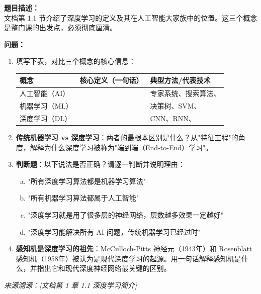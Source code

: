 \documentclass[a4paper,11pt]{ctexart}
\begin{document}
\begin{problembox}
    \textbf{题目描述：}\\
    文档第 1.1 节介绍了深度学习的定义及其在人工智能大家族中的位置。这三个概念是整门课的出发点，必须彻底厘清。

    \vspace{0.3cm}
    \textbf{问题：}
    \begin{enumerate}[(1)]
        \item 填写下表，对比三个概念的核心信息：

        \begin{center}
        \begin{tabular}{p{2.5cm} p{4.5cm} p{4.5cm}}
            \toprule
            概念 & 核心定义（一句话） & 典型方法/代表技术 \\
            \midrule
            人工智能（AI） & \underline{\hspace{4.0cm}} & 专家系统、搜索算法、\underline{\hspace{2.0cm}} \\[1.5em]
            机器学习（ML） & \underline{\hspace{4.0cm}} & 决策树、SVM、\underline{\hspace{2.5cm}} \\[1.5em]
            深度学习（DL） & \underline{\hspace{4.0cm}} & CNN、RNN、\underline{\hspace{2.5cm}} \\
            \bottomrule
        \end{tabular}
        \end{center}

        \item \textbf{传统机器学习 vs 深度学习}：两者的最根本区别是什么？从"特征工程"的角度，解释为什么深度学习被称为"端到端（End-to-End）学习"。

        \item \textbf{判断题}：以下说法是否正确？请逐一判断并说明理由：
        \begin{enumerate}[a.]
            \item "所有深度学习算法都是机器学习算法"
            \item "所有机器学习算法都属于人工智能"
            \item "深度学习就是用了很多层的神经网络，层数越多效果一定越好"
            \item "深度学习能解决所有 AI 问题，传统机器学习已经过时"
        \end{enumerate}

        \item \textbf{感知机是深度学习的祖先}：McCulloch-Pitts 神经元（1943年）和 Rosenblatt 感知机（1958年）被认为是现代深度学习的起源。用一句话解释感知机是什么，并指出它和现代深度神经网络最关键的区别。
    \end{enumerate}

    \vspace{0.2cm}
    {\color{gray}\small\textit{来源溯源：[文档第 1 章 1.1 深度学习简介]}}
\end{problembox}
\end{document}
